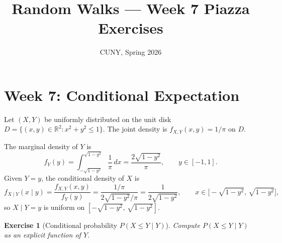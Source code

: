 \documentclass[12pt]{article}
\title{Random Walks --- Week 7 Piazza Exercises}
\author{CUNY, Spring 2026}
\date{}
\newtheorem{exercise}{Exercise}
\theoremstyle{remark}
\begin{document}
\maketitle

\section*{Week 7: Conditional Expectation}

Let $(X, Y)$ be uniformly distributed on the unit disk
$D = \{(x,y) \in \mathbb{R}^2 : x^2 + y^2 \le 1\}$.
The joint density is $f_{X,Y}(x,y) = 1/\pi$ on $D$.

\medskip\noindent
The marginal density of $Y$ is
\[
  f_Y(y) = \int_{-\sqrt{1-y^2}}^{\sqrt{1-y^2}} \frac{1}{\pi}\,dx
  = \frac{2\sqrt{1-y^2}}{\pi}, \qquad y \in [-1,1].
\]
Given $Y = y$, the conditional density of $X$ is
\[
  f_{X \mid Y}(x \mid y) = \frac{f_{X,Y}(x,y)}{f_Y(y)}
  = \frac{1/\pi}{2\sqrt{1-y^2}/\pi}
  = \frac{1}{2\sqrt{1-y^2}},
  \qquad x \in \bigl[-\sqrt{1-y^2},\,\sqrt{1-y^2}\bigr],
\]
so $X \mid Y = y$ is uniform on $[-\sqrt{1-y^2},\,\sqrt{1-y^2}]$.

\begin{exercise}[Conditional probability $P(X \le Y \mid Y)$]
Compute $P(X \le Y \mid Y)$ as an explicit function of $Y$.
\end{exercise}
\end{document}
